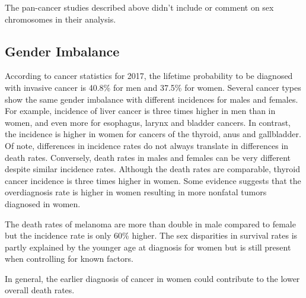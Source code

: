 The pan-cancer studies described above didn't include or comment on sex chromosomes in their analysis\cite{Beroukhim2010,Zack2013,Baudis2007,Kim2013b}.



\subsection{Gender Imbalance}

According to cancer statistics for 2017, the lifetime probability to be diagnosed with invasive cancer is 40.8\% for men and 37.5\% for women\cite{Siegel2017}.
Several cancer types show the same gender imbalance with different incidences for males and females.
For example, incidence of liver cancer is three times higher in men than in women, and even more for esophagus, larynx and bladder cancers.
In contrast, the incidence is higher in women for cancers of the thyroid, anus and gallbladder.
Of note, differences in incidence rates do not always translate in differences in death rates.
Conversely, death rates in males and females can be very different despite similar incidence rates.
Although the death rates are comparable, thyroid cancer incidence is three times higher in women.
Some evidence suggests that the overdiagnosis rate is higher in women resulting in more nonfatal tumors diagnosed in women\cite{OGrady2015}.
\begin{comment}
  In their study of papillary thyroid cancer, \citet{OGrady2015} compared the stage at diagnosis (based on the tumor size) and estimated that 5.5\% of male cases versus 41.1\% of female cases were due to overdiagnosis in individuals ages 20 to 49.
  This could be explained by the fact that women tend to spend more in healthcare and more likely to report illness symptoms and seek medical care.
\end{comment}
The death rates of melanoma are more than double in male compared to female but the incidence rate is only 60\% higher\cite{Siegel2017}.
The sex disparities in survival rates is partly explained by the younger age at diagnosis for women but is still present when controlling for known factors\cite{Scoggins2006}.
\begin{comment}
  After sentinel lymph node biopsies, the survival was compared for different factors such as age, ulceration, thickness, sentinel lymph node.
\end{comment}
In general, the earlier diagnosis of cancer in women could contribute to the lower overall death rates.


